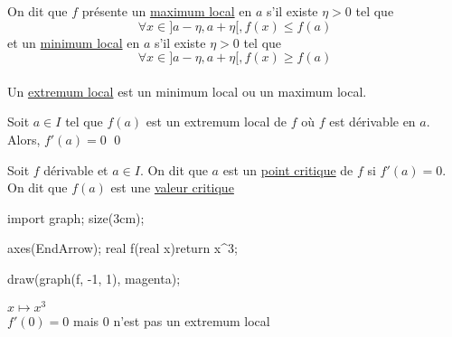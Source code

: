\begin{defn}
	On dit que $f$ présente un \underline{maximum local} en $a$ s'il existe $\eta>0$ tel que \[
		\forall x \in ]a-\eta,a+\eta[, f(x) \le f(a)
	\] et un \underline{minimum local} en $a$ s'il existe $\eta >0$ tel que \[
		\forall x \in ]a-\eta, a+\eta[, f(x) \ge f(a)
	\]\\
	Un \underline{extremum local} est un minimum local ou un maximum local.
\end{defn}

\begin{prop}
	Soit $a \in I$ tel que $f(a)$ est un extremum local de $f$ où $f$ est dérivable en $a$. Alors, $f'(a) = 0$
	\qed
\end{prop}

\begin{defn}
	Soit $f$ dérivable et $a \in I$. On dit que $a$ est un \underline{point critique} de $f$ si $f'(a) = 0$. On dit que $f(a)$ est une \underline{valeur critique}
\end{defn}

\begin{exm}
	\begin{center}
		\begin{asy}
			import graph;
			size(3cm);

			axes(EndArrow);
			real f(real x){return x^3;}

			draw(graph(f, -1, 1), magenta);
		\end{asy}
	\end{center}
	$x \mapsto x^3$\\
	$f'(0) = 0$ mais $0$ n'est pas un extremum local
\end{exm}

